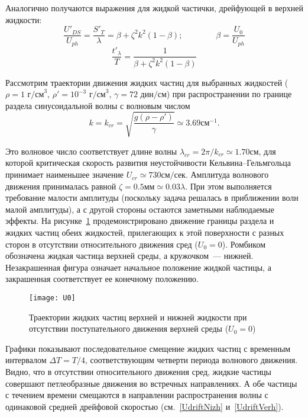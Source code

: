 Аналогично получаются выражения для жидкой частички, дрейфующей в верхней жидкости:
\begin{equation*}
\dfrac{U'_{DS}}{U_{ph}}=\dfrac{S'_{T}}{\lambda}=\beta+\zeta^{2} k^{2}\left(1-\beta \right); \qquad \qquad \beta=\dfrac{U_{0}}{U_{ph}}
\end{equation*}
\begin{equation}
\dfrac{t'_{\lambda}}{T}=\dfrac{1}{\beta+\zeta^{2} k^{2}\left(1-\beta \right)}
\label{Period'}
\end{equation}

Рассмотрим траектории движения жидких частиц для выбранных жидкостей ($ \rho = 1 $ $ \text{г/см}^{3} $, $ \rho' = 10^{-3} $ $ \text{г/см}^{3} $, $ \gamma = 72 $ $ \text{дин/см} $) при распространении по границе раздела синусоидальной волны с волновым числом 
\begin{equation*}
k=k_{cr}=\sqrt{\dfrac{g \left( \rho - \rho' \right)}{\gamma} }\simeq 3.69 \text{см}^{-1}.
\end{equation*}

Это волновое число соответствует длине волны $ \lambda_{cr}=2 \pi /k_{cr}\simeq 1.70 \text{см} $, для которой критическая скорость развития неустойчивости Кельвина--Гельмгольца принимает наименьшее значение $ U_{cr}\simeq 730 \text{см/сек} $. Амплитуда волнового движения принималась равной $ \zeta = 0.5 \text{мм} \simeq 0.03 \lambda $. При этом выполняется требование малости амплитуды (поскольку задача решалась в приближении волн малой амплитуды), а с другой стороны остаются заметными наблюдаемые эффекты. На рисунке~\ref{fig:Traj1} продемонстрировано движение границы раздела и жидких частиц обеих жидкостей, прилегающих к этой поверхности с разных сторон в отсутствии относительного движения сред ($ U_{0}=0 $). Ромбиком обозначена жидкая частица верхней среды, а кружочком~--- нижней. Незакрашенная фигура означает начальное положение жидкой частицы, а закрашенная соответствует ее конечному положению.
\begin{figure}[]
\centering
\texttt{[image: U0]}
\caption{Траектории жидких частиц верхней и нижней жидкости при отсутствии поступательного движения верхней среды ($ U_{0}=0 $)}\label{fig:Traj1}
\end{figure}
Графики показывают последовательное смещение жидких частиц с временным интервалом $ \Delta T = T/4 $, соответствующим четверти периода волнового движения. Видно, что в отсутствии относительного движения сред, жидкие частицы совершают петлеобразные движения во встречных направлениях. А обе частицы с течением времени смещаются в направлении распространения волны с одинаковой средней дрейфовой скоростью (см.~\eqref{UdriftNizh} и~\eqref{UdriftVerh}).

